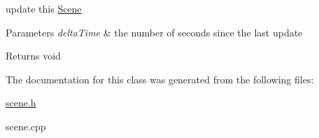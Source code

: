 update this \hyperlink{class_scene}{Scene} 


\begin{DoxyParams}{Parameters}
{\em delta\+Time} & the number of seconds since the last update \\
\hline
\end{DoxyParams}
\begin{DoxyReturn}{Returns}
void 
\end{DoxyReturn}


The documentation for this class was generated from the following files\+:\begin{DoxyCompactItemize}
\item 
\hyperlink{scene_8h}{scene.\+h}\item 
scene.\+cpp\end{DoxyCompactItemize}
